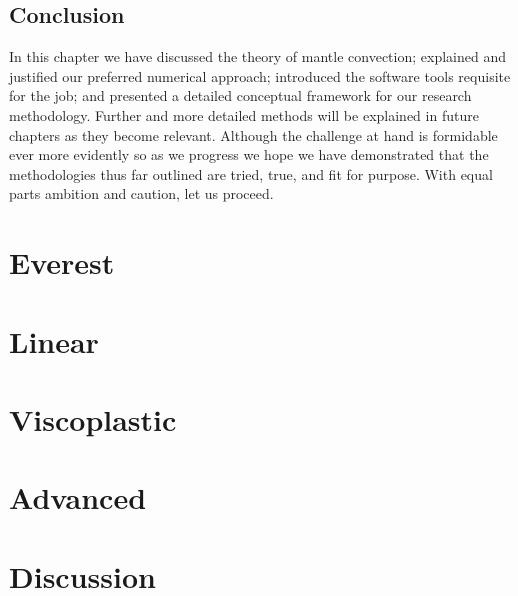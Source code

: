 \documentclass[letterpaper,10pt,english]{jupyterBook}
\begin{document}
\section{Conclusion}
\label{\detokenize{content/chapter_02_methods/conclusion:conclusion}}\label{\detokenize{content/chapter_02_methods/conclusion::doc}}
\sphinxAtStartPar
In this chapter we have discussed the theory of mantle convection; explained and justified our preferred numerical approach; introduced the software tools requisite for the job; and presented a detailed conceptual framework for our research methodology. Further and more detailed methods will be explained in future chapters as they become relevant. Although the challenge at hand is formidable \sphinxhyphen{} ever more evidently so as we progress \sphinxhyphen{} we hope we have demonstrated that the methodologies thus far outlined are tried, true, and fit for purpose. With equal parts ambition and caution, let us proceed.


\chapter{Everest}
\label{\detokenize{content/chapter_03_everest/main:everest}}\label{\detokenize{content/chapter_03_everest/main::doc}}

\chapter{Linear}
\label{\detokenize{content/chapter_04_linear/main:linear}}\label{\detokenize{content/chapter_04_linear/main::doc}}

\chapter{Viscoplastic}
\label{\detokenize{content/chapter_05_viscoplastic/main:viscoplastic}}\label{\detokenize{content/chapter_05_viscoplastic/main::doc}}

\chapter{Advanced}
\label{\detokenize{content/chapter_06_advanced/main:advanced}}\label{\detokenize{content/chapter_06_advanced/main::doc}}

\chapter{Discussion}
\label{\detokenize{content/chapter_07_discussion/main:discussion}}\label{\detokenize{content/chapter_07_discussion/main::doc}}
\end{document}
